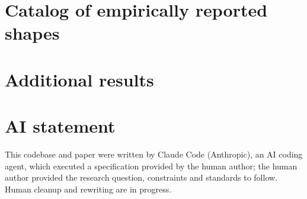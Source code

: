 \documentclass[10pt]{article}
\begin{document}



\appendix
\section{Catalog of empirically reported shapes}
\label{app:catalog}

\section{Additional results}


\section*{AI statement}
This codebase and paper were written by Claude Code (Anthropic), an AI coding agent, which executed a specification provided by the human author; the human author provided the research question, constraints and standards to follow. Human cleanup and rewriting are in progress.
\end{document}
